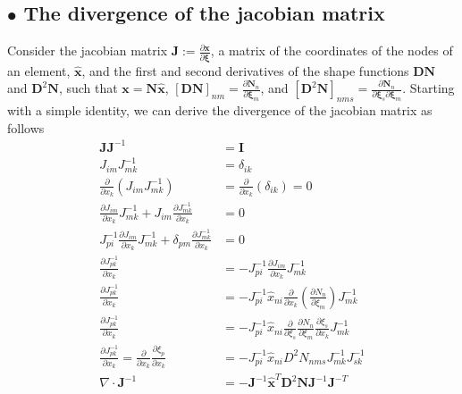 \documentclass[11pt]{amsart}
\begin{document}
\subsection*{$\bullet$ The divergence of the jacobian matrix}
Consider the jacobian matrix  $\boldsymbol{J} := \frac{\partial \boldsymbol{x}}{\partial \boldsymbol{\xi}}$, a matrix of the coordinates of the nodes of an element, $\hat{\boldsymbol{x}}$, and the first and second derivatives of the shape functions $\boldsymbol{DN}$ and $\boldsymbol{D}^2\boldsymbol{N}$, such that $\boldsymbol{x} = \boldsymbol{N}\hat{\boldsymbol{x}}$, $[\boldsymbol{DN}]_{nm} = \frac{\partial\boldsymbol{N}_n}{\partial\boldsymbol{\xi}_m}$, and $[\boldsymbol{D}^2\boldsymbol{N}]_{nms} = \frac{\partial\boldsymbol{N}_n}{\partial\boldsymbol{\xi}_s\partial\boldsymbol{\xi}_m}$.  Starting with a simple identity, we can derive the divergence of the jacobian matrix as follows
\begin{align*}
  \boldsymbol{J} \boldsymbol{J}^{-1} & =  \boldsymbol{I}  \\
  J_{im} J^{-1}_{mk} & = \delta_{ik}  \\
  \frac{\partial}{\partial x_k} \left( J_{im} J^{-1}_{mk}  \right) & =  \frac{\partial}{\partial x_k} \left( \delta_{ik} \right) = 0 \\
  \frac{\partial J_{im}}{\partial x_k} J^{-1}_{mk} + J_{im} \frac{\partial J^{-1}_{mk}}{\partial x_k} & =  0  \\
  J^{-1}_{pi} \frac{\partial J_{im}}{\partial x_k} J^{-1}_{mk} + \delta_{pm} \frac{\partial J^{-1}_{mk}}{\partial x_k} & =  0  \\
\frac{\partial J^{-1}_{pk} }{\partial x_k} & =  -J^{-1}_{pi} \frac{\partial J_{im}}{\partial x_k} J^{-1}_{mk}  \\
\frac{\partial J^{-1}_{pk} }{\partial x_k} & =  -J^{-1}_{pi} \hat{x}_{ni} \frac{\partial }{\partial x_k}  \left(\frac{\partial N_n}{\partial \xi_m}\right)J^{-1}_{mk} \\
\frac{\partial J^{-1}_{pk} }{\partial x_k} & =  -J^{-1}_{pi} \hat{x}_{ni}\frac{\partial }{\partial \xi_s} \frac{\partial N_n}{\partial \xi_m} \frac{\partial \xi_s}{\partial x_k}J^{-1}_{mk}  \\
\frac{\partial J^{-1}_{pk} }{\partial x_k} = \frac{\partial}{\partial x_k} \frac{\partial \xi_p}{\partial x_k} & =  -J^{-1}_{pi}\hat{x}_{ni} D^2N_{nms} J^{-1}_{mk} J^{-1}_{sk}  \\
\nabla \cdot \boldsymbol{J}^{-1} & =  - \boldsymbol{J}^{-1} \hat{\boldsymbol{x}}^T \boldsymbol{D}^2\boldsymbol{N} \boldsymbol{J}^{-1} \boldsymbol{J}^{-T} 
\end{align*}
\end{document}
